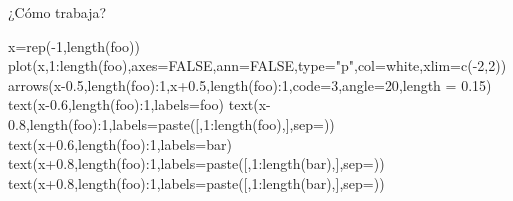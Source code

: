 \documentclass[
  ignorenonframetext,
  aspectratio=169,
  spanish,
]{beamer}
\newenvironment{Shaded}{\begin{snugshade}}{\end{snugshade}}
\newcommand{\AttributeTok}[1]{\textcolor[rgb]{0.40,0.45,0.13}{#1}}
\newcommand{\ConstantTok}[1]{\textcolor[rgb]{0.56,0.35,0.01}{#1}}
\newcommand{\DecValTok}[1]{\textcolor[rgb]{0.68,0.00,0.00}{#1}}
\newcommand{\FloatTok}[1]{\textcolor[rgb]{0.68,0.00,0.00}{#1}}
\newcommand{\FunctionTok}[1]{\textcolor[rgb]{0.28,0.35,0.67}{#1}}
\newcommand{\NormalTok}[1]{\textcolor[rgb]{0.00,0.23,0.31}{#1}}
\newcommand{\OtherTok}[1]{\textcolor[rgb]{0.00,0.23,0.31}{#1}}
\newcommand{\SpecialCharTok}[1]{\textcolor[rgb]{0.37,0.37,0.37}{#1}}
\newcommand{\StringTok}[1]{\textcolor[rgb]{0.13,0.47,0.30}{#1}}
\begin{document}
\begin{frame}[fragile]{¿Cómo trabaja?}
\label{cuxf3mo-trabaja}
\begin{Shaded}
\begin{Highlighting}[]
\NormalTok{x}\OtherTok{=}\FunctionTok{rep}\NormalTok{(}\SpecialCharTok{{-}}\DecValTok{1}\NormalTok{,}\FunctionTok{length}\NormalTok{(foo)) }
\FunctionTok{plot}\NormalTok{(x,}\DecValTok{1}\SpecialCharTok{:}\FunctionTok{length}\NormalTok{(foo),}\AttributeTok{axes=}\ConstantTok{FALSE}\NormalTok{,}\AttributeTok{ann=}\ConstantTok{FALSE}\NormalTok{,}\AttributeTok{type=}\StringTok{"p"}\NormalTok{,}\AttributeTok{col=}\StringTok{\textquotesingle{}white\textquotesingle{}}\NormalTok{,}\AttributeTok{xlim=}\FunctionTok{c}\NormalTok{(}\SpecialCharTok{{-}}\DecValTok{2}\NormalTok{,}\DecValTok{2}\NormalTok{))}
\FunctionTok{arrows}\NormalTok{(x}\FloatTok{{-}0.5}\NormalTok{,}\FunctionTok{length}\NormalTok{(foo)}\SpecialCharTok{:}\DecValTok{1}\NormalTok{,x}\FloatTok{+0.5}\NormalTok{,}\FunctionTok{length}\NormalTok{(foo)}\SpecialCharTok{:}\DecValTok{1}\NormalTok{,}\AttributeTok{code=}\DecValTok{3}\NormalTok{,}\AttributeTok{angle=}\DecValTok{20}\NormalTok{,}\AttributeTok{length =} \FloatTok{0.15}\NormalTok{)}
\FunctionTok{text}\NormalTok{(x}\FloatTok{{-}0.6}\NormalTok{,}\FunctionTok{length}\NormalTok{(foo)}\SpecialCharTok{:}\DecValTok{1}\NormalTok{,}\AttributeTok{labels=}\NormalTok{foo)}
\FunctionTok{text}\NormalTok{(x}\FloatTok{{-}0.8}\NormalTok{,}\FunctionTok{length}\NormalTok{(foo)}\SpecialCharTok{:}\DecValTok{1}\NormalTok{,}\AttributeTok{labels=}\FunctionTok{paste}\NormalTok{(}\StringTok{\textquotesingle{}[\textquotesingle{}}\NormalTok{,}\DecValTok{1}\SpecialCharTok{:}\FunctionTok{length}\NormalTok{(foo),}\StringTok{\textquotesingle{}]\textquotesingle{}}\NormalTok{,}\AttributeTok{sep=}\StringTok{\textquotesingle{}\textquotesingle{}}\NormalTok{))}
\FunctionTok{text}\NormalTok{(x}\FloatTok{+0.6}\NormalTok{,}\FunctionTok{length}\NormalTok{(foo)}\SpecialCharTok{:}\DecValTok{1}\NormalTok{,}\AttributeTok{labels=}\NormalTok{bar)}
\FunctionTok{text}\NormalTok{(x}\FloatTok{+0.8}\NormalTok{,}\FunctionTok{length}\NormalTok{(foo)}\SpecialCharTok{:}\DecValTok{1}\NormalTok{,}\AttributeTok{labels=}\FunctionTok{paste}\NormalTok{(}\StringTok{\textquotesingle{}[\textquotesingle{}}\NormalTok{,}\DecValTok{1}\SpecialCharTok{:}\FunctionTok{length}\NormalTok{(bar),}\StringTok{\textquotesingle{}]\textquotesingle{}}\NormalTok{,}\AttributeTok{sep=}\StringTok{\textquotesingle{}\textquotesingle{}}\NormalTok{))}
\FunctionTok{text}\NormalTok{(x}\FloatTok{+0.8}\NormalTok{,}\FunctionTok{length}\NormalTok{(foo)}\SpecialCharTok{:}\DecValTok{1}\NormalTok{,}\AttributeTok{labels=}\FunctionTok{paste}\NormalTok{(}\StringTok{\textquotesingle{}[\textquotesingle{}}\NormalTok{,}\DecValTok{1}\SpecialCharTok{:}\FunctionTok{length}\NormalTok{(bar),}\StringTok{\textquotesingle{}]\textquotesingle{}}\NormalTok{,}\AttributeTok{sep=}\StringTok{\textquotesingle{}\textquotesingle{}}\NormalTok{))}

\end{Highlighting}
\end{Shaded}
\end{frame}
\end{document}
